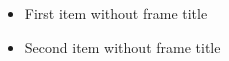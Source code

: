 \documentclass[14pt,t]{beamer}
\begin{document}
\begin{frame}
\begin{itemize}
\item First item without frame title
\item Second item without frame title
\end{itemize}
\end{frame}
\end{document}
